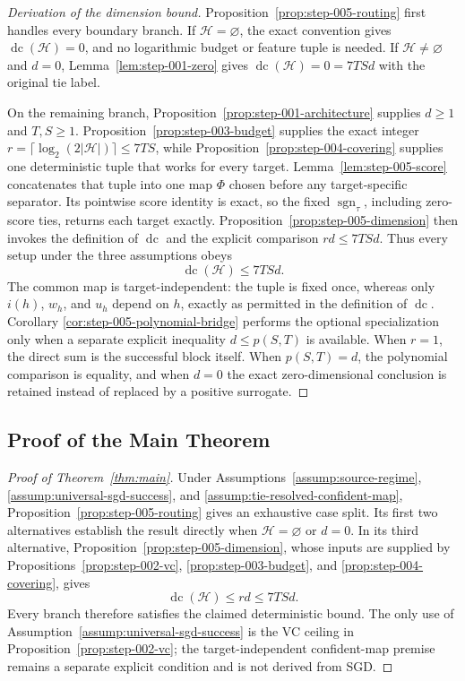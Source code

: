 \begin{proof}[Derivation of the dimension bound]
Proposition~\ref{prop:step-005-routing} first handles every boundary branch.
If $\mathcal H=\varnothing$, the exact convention gives
$\operatorname{dc}(\mathcal H)=0$, and no logarithmic budget or feature tuple
is needed.  If $\mathcal H\neq\varnothing$ and $d=0$,
Lemma~\ref{lem:step-001-zero} gives
$\operatorname{dc}(\mathcal H)=0=7TSd$ with the original tie label.

On the remaining branch, Proposition~\ref{prop:step-001-architecture}
supplies $d\geq1$ and $T,S\geq1$.
Proposition~\ref{prop:step-003-budget} supplies the exact integer
$r=\lceil\log_2(2|\mathcal H|)\rceil\leq7TS$, while
Proposition~\ref{prop:step-004-covering} supplies one deterministic tuple that
works for every target.  Lemma~\ref{lem:step-005-score} concatenates that
tuple into one map $\Phi$ chosen before any target-specific separator.  Its
pointwise score identity is exact, so the fixed $\operatorname{sgn}_{\tau}$,
including zero-score ties, returns each target exactly.
Proposition~\ref{prop:step-005-dimension} then invokes the definition of
$\operatorname{dc}$ and the explicit comparison $rd\leq7TSd$.  Thus every
setup under the three assumptions obeys
\[
\operatorname{dc}(\mathcal H)\leq7TSd.
\]
The common map is target-independent: the tuple is fixed once, whereas only
$i(h)$, $w_h$, and $u_h$ depend on $h$, exactly as permitted in the
definition of $\operatorname{dc}$.  Corollary
\ref{cor:step-005-polynomial-bridge} performs the optional specialization only
when a separate explicit inequality $d\leq p(S,T)$ is available.
When $r=1$, the direct sum is the successful block itself.  When
$p(S,T)=d$, the polynomial comparison is equality, and when $d=0$ the exact
zero-dimensional conclusion is retained instead of replaced by a positive
surrogate.
\end{proof}

\subsection{Proof of the Main Theorem}
\label{app:main-proof}

\begin{proof}[Proof of Theorem~\ref{thm:main}]
Under Assumptions~\ref{assump:source-regime},
\ref{assump:universal-sgd-success}, and
\ref{assump:tie-resolved-confident-map},
Proposition~\ref{prop:step-005-routing} gives an exhaustive case split.  Its
first two alternatives establish the result directly when
$\mathcal H=\varnothing$ or $d=0$.  In its third alternative,
Proposition~\ref{prop:step-005-dimension}, whose inputs are supplied by
Propositions~\ref{prop:step-002-vc}, \ref{prop:step-003-budget}, and
\ref{prop:step-004-covering}, gives
\[
\operatorname{dc}(\mathcal H)\leq rd\leq7TSd.
\]
Every branch therefore satisfies the claimed deterministic bound.  The only
use of Assumption~\ref{assump:universal-sgd-success} is the VC ceiling in
Proposition~\ref{prop:step-002-vc}; the target-independent confident-map
premise remains a separate explicit condition and is not derived from SGD.
\end{proof}
